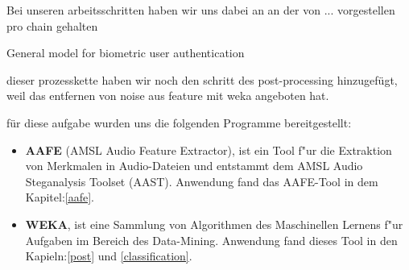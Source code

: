 Bei unseren arbeitsschritten haben wir uns dabei an
an der von ... vorgestellen pro chain gehalten

General model for biometric user authentication
\cite{vielhauer}


dieser prozesskette haben wir noch den schritt des post-processing hinzugefügt, 
weil das entfernen von noise aus feature mit weka angeboten hat.


für diese aufgabe wurden uns die folgenden Programme bereitgestellt:

\begin{itemize}
	\item[\textbullet] \textbf{AAFE} (AMSL Audio Feature Extractor), ist ein Tool f"ur die Extraktion von Merkmalen in Audio-Dateien und entstammt dem AMSL Audio Steganalysis Toolset (AAST).\cite{kraetzer} Anwendung fand das AAFE-Tool in dem Kapitel:\ref{aafe}.
	\item[\textbullet] \textbf{WEKA}, ist eine Sammlung von Algorithmen des Maschinellen Lernens f"ur Aufgaben im Bereich des Data-Mining.\cite{weka} Anwendung fand dieses Tool in den Kapieln:\ref{post} und \ref{classification}.
\end{itemize}

